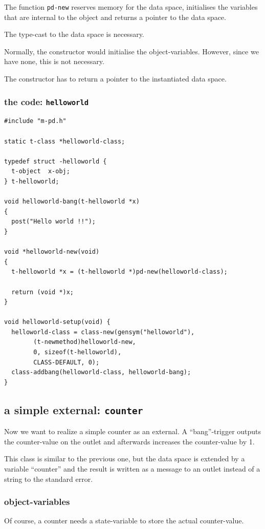 \documentclass{ppgmus}
\begin{document}
The function \verb+pd-new+ reserves memory for the data space,
initialises the variables that are internal to the object and
returns a pointer to the data space.

The type-cast to the data space is necessary.

Normally, the constructor would initialise the object-variables.
However, since we have none, this is not necessary.


The constructor has to return a pointer to the instantiated data space.

\subsubsection{the code: \tt helloworld}

\begin{verbatim}
#include "m-pd.h"

static t-class *helloworld-class;

typedef struct -helloworld {
  t-object  x-obj;
} t-helloworld;

void helloworld-bang(t-helloworld *x)
{
  post("Hello world !!");
}

void *helloworld-new(void)
{
  t-helloworld *x = (t-helloworld *)pd-new(helloworld-class);

  return (void *)x;
}

void helloworld-setup(void) {
  helloworld-class = class-new(gensym("helloworld"),
        (t-newmethod)helloworld-new,
        0, sizeof(t-helloworld),
        CLASS-DEFAULT, 0);
  class-addbang(helloworld-class, helloworld-bang);
}
\end{verbatim}


\subsection{a simple external: {\tt counter}}

Now we want to realize a simple counter as an external.
A ``bang''-trigger outputs the counter-value on the outlet and
afterwards increases the counter-value by 1.

This class is similar to the previous one,
but the data space is extended by a variable ``counter'' and the
result is written as a message to an outlet instead of 
a string to the standard error.

\subsubsection{object-variables}
Of course, a counter needs a state-variable to store the actual counter-value.
\end{document}
